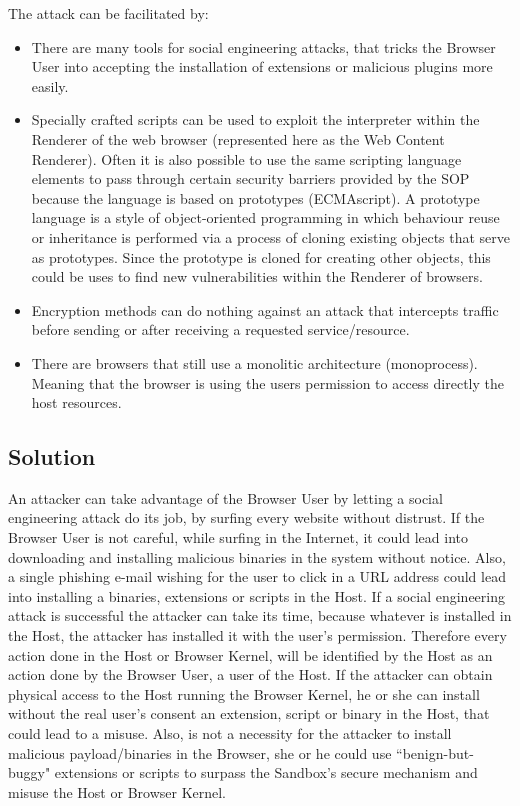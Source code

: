\documentclass{sig-alternate-05-2015}
\begin{document}
The attack can be facilitated by:
\begin{itemize}
  \item There are many tools for social engineering attacks, that tricks the Browser User into accepting the installation of extensions or malicious plugins more easily.
  \item Specially crafted scripts can be used to exploit the interpreter within the Renderer of the web browser (represented here as the Web Content Renderer). Often it is also possible to use the same scripting language elements to pass through certain security barriers provided by the SOP because the language is based on prototypes (ECMAscript). A prototype language is a style of object-oriented programming in which behaviour reuse or inheritance is performed via a process of cloning existing objects that serve as prototypes. Since the prototype is cloned for creating other objects, this could be uses to find new vulnerabilities within the Renderer of browsers.
  \item Encryption methods can do nothing against an attack that intercepts traffic before sending or after receiving a requested service/resource.
  \item There are browsers that still use a monolitic architecture (monoprocess). Meaning that the browser is using the users permission to access directly the host resources.
\end{itemize}
\subsection*{Solution}
An attacker can take advantage of the Browser User by letting a social engineering attack do its job, by surfing every website without distrust. If the Browser User is not careful, while surfing in the Internet, it could lead into downloading and installing malicious binaries in the system without notice. Also, a single phishing e-mail wishing for the user to click in a URL address could lead into installing a binaries, extensions or scripts in the Host. If a social engineering attack is successful the attacker can take its time, because whatever is installed in the Host, the attacker has installed it with the user's permission. Therefore every action done in the Host or Browser Kernel, will be identified by the Host as an action done by the Browser User, a user of the Host. 
If the attacker can obtain physical access to the Host running the Browser Kernel, he or she can install without the real user's consent an extension, script or binary in the Host, that could lead to a misuse. Also, is not a necessity for the attacker to install malicious payload/binaries in the Browser, she or he could use ``benign-but-buggy" extensions or scripts to surpass the Sandbox's secure mechanism and misuse the Host or Browser Kernel.
\end{document}
